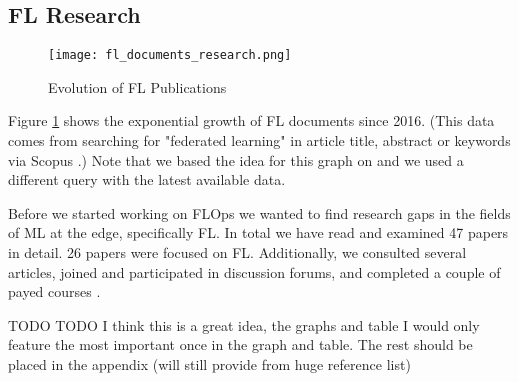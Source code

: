 %
%
%
\subsection{FL Research}\label{subsection:fl_research}

\begin{figure}[h]
    \centering
    \texttt{[image: fl\_documents\_research.png]}
    \caption{Evolution of FL Publications}
    \label{fig:fl_documents_research}
\end{figure}

Figure \ref{fig:fl_documents_research} shows the exponential growth of FL documents
since 2016. (This data comes from searching for "federated learning" in article title, abstract or keywords via Scopus \cite{scopus_homepage}.)
Note that we based the idea for this graph on \cite{thesis:tum_fl_framework_comparison}
and we used a different query with the latest available data.

Before we started working on FLOps we wanted to find research gaps in the fields of 
ML at the edge, specifically FL.
In total we have read and examined 47 papers in detail. 
26 papers were focused on FL. 
Additionally, we consulted several articles,
joined and participated in discussion forums,
and completed a couple of payed courses \cite{udemy_homepage}.

TODO TODO 
I think this is a great idea, the graphs and table
I would only feature the most important once in the graph and table.
The rest should be placed in the appendix (will still provide from huge reference list)

